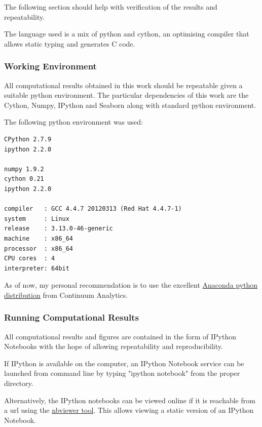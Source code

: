 \documentclass{article} %
\begin{document}
The following section should help with verification of the results and repeatability.\newline

The language used is a mix of python and cython, an optimising compiler that allows static typing and generates C code.


\subsubsection{Working Environment}
All computational results obtained in this work should be repeatable given a suitable python environment. The particular dependencies of this work are the Cython, Numpy, IPython and Seaborn along with standard python environment.\newline

The following python environment was used:

\begin{verbatim}
CPython 2.7.9
ipython 2.2.0

numpy 1.9.2
cython 0.21
ipython 2.2.0

compiler   : GCC 4.4.7 20120313 (Red Hat 4.4.7-1)
system     : Linux
release    : 3.13.0-46-generic
machine    : x86_64
processor  : x86_64
CPU cores  : 4
interpreter: 64bit

\end{verbatim}

As of now, my personal recommendation is to use the excellent \href{http://continuum.io/downloads}{Anaconda python distribution} from Continuum Analytics.


\subsubsection{Running Computational Results}

All computational results and figures are contained in the form of IPython Notebooks with the hope of allowing repeatability and reproducibility.\newline

If IPython is available on the computer, an IPython Notebook service can be launched from command line by typing "ipython notebook" from the proper directory.\newline

Alternatively, the IPython notebooks can be viewed online if it is reachable from a url using the \href{http://nbviewer.IPython.org/}{nbviewer tool}. This allows viewing a static version of an IPython Notebook.
\end{document}
